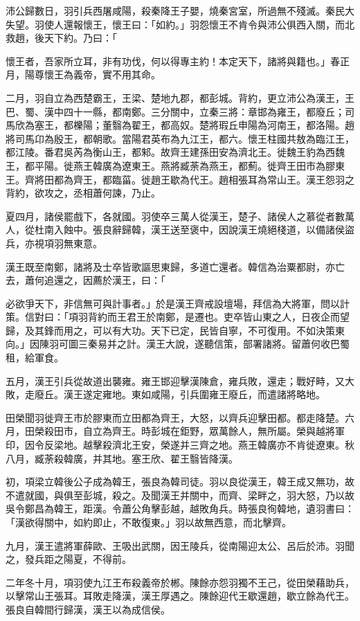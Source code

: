 \begin{pinyinscope}
沛公歸數日，羽引兵西屠咸陽，殺秦降王子嬰，燒秦宮室，所過無不殘滅。秦民大失望。羽使人還報懷王，懷王曰：「如約。」羽怨懷王不肯令與沛公俱西入關，而北救趙，後天下約。乃曰：「

懷王者，吾家所立耳，非有功伐，何以得專主約！本定天下，諸將與籍也。」春正月，陽尊懷王為義帝，實不用其命。

二月，羽自立為西楚霸王，王梁、楚地九郡，都彭城。背約，更立沛公為漢王，王巴、蜀、漢中四十一縣，都南鄭。三分關中，立秦三將：章邯為雍王，都廢丘；司馬欣為塞王，都櫟陽；董翳為翟王，都高奴。楚將瑕丘申陽為河南王，都洛陽。趙將司馬卬為殷王，都朝歌。當陽君英布為九江王，都六。懷王柱國共敖為臨江王，都江陵。番君吳芮為衡山王，都邾。故齊王建孫田安為濟北王。徙魏王豹為西魏王，都平陽。徙燕王韓廣為遼東王。燕將臧荼為燕王，都薊。徙齊王田市為膠東王。齊將田都為齊王，都臨菑。徙趙王歇為代王。趙相張耳為常山王。漢王怨羽之背約，欲攻之，丞相蕭何諫，乃止。

夏四月，諸侯罷戲下，各就國。羽使卒三萬人從漢王，楚子、諸侯人之慕從者數萬人，從杜南入蝕中。張良辭歸韓，漢王送至褒中，因說漢王燒絕棧道，以備諸侯盜兵，亦視項羽無東意。

漢王既至南鄭，諸將及士卒皆歌謳思東歸，多道亡還者。韓信為治粟都尉，亦亡去，蕭何追還之，因薦於漢王，曰：「

必欲爭天下，非信無可與計事者。」於是漢王齊戒設壇場，拜信為大將軍，問以計策。信對曰：「項羽背約而王君王於南鄭，是遷也。吏卒皆山東之人，日夜企而望歸，及其鋒而用之，可以有大功。天下已定，民皆自寧，不可復用。不如決策東向。」因陳羽可圖三秦易并之計。漢王大說，遂聽信策，部署諸將。留蕭何收巴蜀租，給軍食。

五月，漢王引兵從故道出襲雍。雍王邯迎擊漢陳倉，雍兵敗，還走；戰好畤，又大敗，走廢丘。漢王遂定雍地。東如咸陽，引兵圍雍王廢丘，而遣諸將略地。

田榮聞羽徙齊王市於膠東而立田都為齊王，大怒，以齊兵迎擊田都。都走降楚。六月，田榮殺田市，自立為齊王。時彭城在鉅野，眾萬餘人，無所屬。榮與越將軍印，因令反梁地。越擊殺濟北王安，榮遂并三齊之地。燕王韓廣亦不肯徙遼東。秋八月，臧荼殺韓廣，并其地。塞王欣、翟王翳皆降漢。

初，項梁立韓後公子成為韓王，張良為韓司徒。羽以良從漢王，韓王成又無功，故不遣就國，與俱至彭城，殺之。及聞漢王并關中，而齊、梁畔之，羽大怒，乃以故吳令鄭昌為韓王，距漢。令蕭公角擊彭越，越敗角兵。時張良徇韓地，遺羽書曰：「漢欲得關中，如約即止，不敢復東。」羽以故無西意，而北擊齊。

九月，漢王遣將軍薛歐、王吸出武關，因王陵兵，從南陽迎太公、呂后於沛。羽聞之，發兵距之陽夏，不得前。

二年冬十月，項羽使九江王布殺義帝於郴。陳餘亦怨羽獨不王己，從田榮藉助兵，以擊常山王張耳。耳敗走降漢，漢王厚遇之。陳餘迎代王歇還趙，歇立餘為代王。張良自韓間行歸漢，漢王以為成信侯。


\end{pinyinscope}
